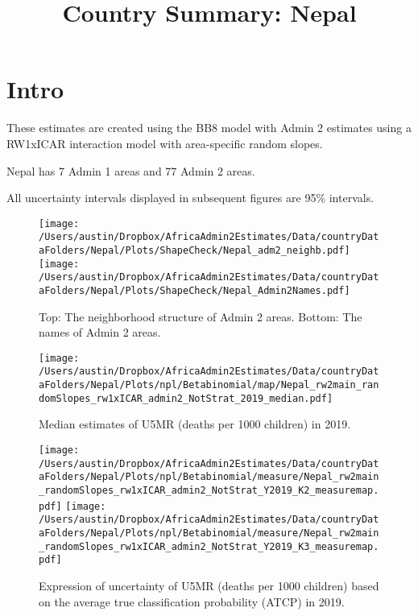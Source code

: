 \documentclass[]{article}
\title{Country Summary: Nepal}
\author{}
\date{\vspace{-2.5em}}
\begin{document}
\maketitle

{
\setcounter{tocdepth}{2}
\tableofcontents
}
\hypertarget{intro}{%
\section{Intro}\label{intro}}

These estimates are created using the BB8 model with Admin 2 estimates
using a RW1xICAR interaction model with area-specific random slopes.

\par

Nepal has 7 Admin 1 areas and 77 Admin 2 areas.

\par

All uncertainty intervals displayed in subsequent figures are 95\%
intervals.

\begin{figure}
\centering
\texttt{[image: /Users/austin/Dropbox/AfricaAdmin2Estimates/Data/countryDataFolders/Nepal/Plots/ShapeCheck/Nepal\_adm2\_neighb.pdf]}
\texttt{[image: /Users/austin/Dropbox/AfricaAdmin2Estimates/Data/countryDataFolders/Nepal/Plots/ShapeCheck/Nepal\_Admin2Names.pdf]}
\caption{Top: The neighborhood structure of Admin 2 areas. Bottom: The names of Admin 2 areas.}
\end{figure}
\clearpage

\begin{figure}
\centering
\texttt{[image: /Users/austin/Dropbox/AfricaAdmin2Estimates/Data/countryDataFolders/Nepal/Plots/npl/Betabinomial/map/Nepal\_rw2main\_randomSlopes\_rw1xICAR\_admin2\_NotStrat\_2019\_median.pdf]}
\caption{Median estimates of U5MR (deaths per 1000 children) in 2019.}
\end{figure}
\begin{figure}
\centering
\texttt{[image: /Users/austin/Dropbox/AfricaAdmin2Estimates/Data/countryDataFolders/Nepal/Plots/npl/Betabinomial/measure/Nepal\_rw2main\_randomSlopes\_rw1xICAR\_admin2\_NotStrat\_Y2019\_K2\_measuremap.pdf]}
\texttt{[image: /Users/austin/Dropbox/AfricaAdmin2Estimates/Data/countryDataFolders/Nepal/Plots/npl/Betabinomial/measure/Nepal\_rw2main\_randomSlopes\_rw1xICAR\_admin2\_NotStrat\_Y2019\_K3\_measuremap.pdf]}
\caption{Expression of uncertainty of U5MR (deaths per 1000 children) based on the average true classification probability (ATCP) in 2019.}
\end{figure}
\clearpage
\end{document}
